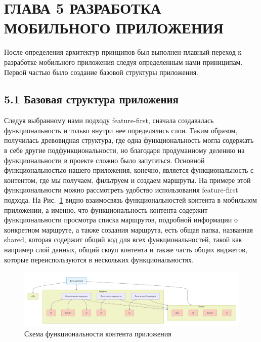 \section{ГЛАВА 5 РАЗРАБОТКА МОБИЛЬНОГО ПРИЛОЖЕНИЯ}

После определения архитектур принципов был выполнен плавный переход к разработке мобильного приложения следуя определенным нами приниципам. 
Первой частью было создание базовой структуры приложения.

\subsection*{5.1 Базовая структура приложения}
Следуя выбранному нами подходу feature-first, сначала создавалась функциональность и только внутри нее определялись слои. 
Таким образом, получилась древовидная структура, где одна функциональность могла содержать в себе другие подфункциональности, 
но благодаря продуманному делению на функциональности в проекте сложно было запутаться. 
Основной функциональностью нашего приложения, конечно, является функциональность с контентом, где мы получаем, фильтруем и создаем маршруты. 
На примере этой функциональности можно рассмотреть удобство использования feature-first подхода. На Рис.~\ref{fig:feature_structure} видно взаимосвязь функциональностей контента в мобильном приложении, а именно, что функциональность контента содержит функциональности просмотра списка маршрутов, подробной информации о конкретном маршруте, а также создания маршрута, есть общая папка, названная shared, которая содержит общий код для всех функциональностей, такой как например слой данных, общий скоуп контента и также часть общих виджетов, которые переиспользуются в нескольких функциональностях.

\begin{landscape}
\begin{figure}[H]
\centering
\includegraphics[height=0.4\textwidth]{Images/mobile_logic/структура_фичи.png}
\caption{Схема функциональности контента приложения}
\label{fig:feature_structure}
\end{figure}
\end{landscape}


